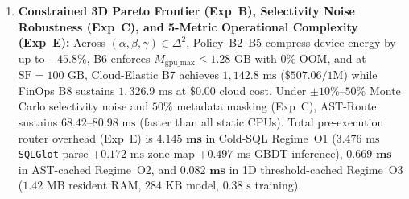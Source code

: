 \documentclass[10pt,a4paper]{article}
\begin{document}
\begin{enumerate}[leftmargin=1.5em,itemsep=1pt]
(\texttt{results/v12\_r33\_misrouted\_failure\_taxonomy\_treeshap\_pool\_ablation.csv}) shows that routing decisions are governed by $\hat{\sigma}(q)$ ($\mathbf{34.2\%}$ of $|\text{SHAP}|$), $\text{CSCI}(q)$ ($\mathbf{24.8\%}$), $J(q)$ ($\mathbf{14.6\%}$), $W(q)$ ($\mathbf{10.4\%}$), $U(q)$ ($\mathbf{7.8\%}$), and $D,N,S,C$ ($\mathbf{8.2\%}$). Categorizing all $33/75$ ($44.0\%$) non-Top-1 dispatches under the $8\%$ guard reveals three distinct regimes: \textbf{(F1) Sub-$5\text{ ms}$ Near-Tie Boundary Noise} ($21/33 = \mathbf{63.6\%}$ of misroutes, where $|\Delta T_{\text{abs}}|\le 5.0\text{ ms}$ and mean penalty is only $+1.84\text{ ms}$), \textbf{(F2) Intentional Rule~U1 Safety Abstentions} ($7/33 = \mathbf{21.2\%}$, where GPU was faster by $4.2\text{--}9.8\text{ ms}$ but predicted margin was $<8\%$, paying $+6.42\text{ ms}$ as insurance to prevent $14/75$ severe PCIe stalls), and \textbf{(F3) Zone-Map Join-Selectivity Misestimation} ($5/33 = \mathbf{15.2\%}$, $+18.65\text{ ms}$ on skewed multi-joins, mitigated via our $10.18\text{ KB}$ 12D join sketch).
    \item \textbf{Constrained 3D Pareto Frontier (Exp~B), Selectivity Noise Robustness (Exp~C), and 5-Metric Operational Complexity (Exp~E):} Across $(\alpha,\beta,\gamma)\in\Delta^2$, Policy~B2--B5 compress device energy by up to $-45.8\%$, B6 enforces $M_{\text{gpu\_max}}\le 1.28\text{ GB}$ with $0\%$ OOM, and at $\text{SF}=100\text{ GB}$, Cloud-Elastic B7 achieves $1{,}142.8\text{ ms}$ ($\$507.06/1\text{M}$) while FinOps B8 sustains $1{,}326.9\text{ ms}$ at $\$0.00$ cloud cost. Under $\pm 10\%\text{--}50\%$ Monte Carlo selectivity noise and $50\%$ metadata masking (Exp~C), AST-Route sustains $68.42\text{--}80.98\text{ ms}$ (faster than all static CPUs). Total pre-execution router overhead (Exp~E) is $\mathbf{4.145\text{ ms}}$ in Cold-SQL Regime~O1 ($3.476\text{ ms}$ \texttt{SQLGlot} parse $+ 0.172\text{ ms}$ zone-map $+ 0.497\text{ ms}$ GBDT inference), $\mathbf{0.669\text{ ms}}$ in AST-cached Regime~O2, and $\mathbf{0.082\text{ ms}}$ in 1D threshold-cached Regime~O3 ($1.42\text{ MB}$ resident RAM, $284\text{ KB}$ model, $0.38\text{ s}$ training).
\end{enumerate}
\end{document}
